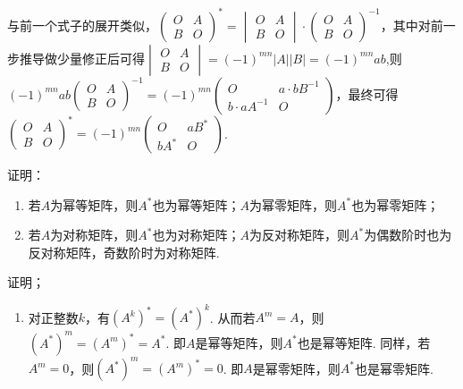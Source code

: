 \begin{exercise}
\begin{exgroup}
\begin{answer}
            与前一个式子的展开类似，$\begin{pmatrix}
                    O & A \\ B & O
                \end{pmatrix}^*=\begin{vmatrix}
                    O & A \\ B & O
                \end{vmatrix}\cdot \begin{pmatrix}
                    O & A \\ B & O
                \end{pmatrix}^{-1}$，其中对前一步推导做少量修正后可得$\begin{vmatrix}
                    O & A \\ B & O
                \end{vmatrix}=(-1)^{mn}|A||B|=(-1)^{mn}ab$,则$(-1)^{mn}ab\begin{pmatrix}
                    O & A \\ B & O
                \end{pmatrix}^{-1}=(-1)^{mn}\begin{pmatrix}
                    O & a\cdot bB^{-1} \\ b\cdot aA^{-1} & O
                \end{pmatrix}$，最终可得$\begin{pmatrix}
                    O & A \\ B & O
                \end{pmatrix}^*=(-1)^{mn}\begin{pmatrix}
                    O & aB^* \\ bA^* & O
                \end{pmatrix}$.
        \end{answer}

        \item 证明：
        \begin{enumerate}
            \item 若$A$为幂等矩阵，则$A^*$也为幂等矩阵；$A$为幂零矩阵，则$A^*$也为幂零矩阵；

            \item 若$A$为对称矩阵，则$A^*$也为对称矩阵；$A$为反对称矩阵，则$A^*$为偶数阶时也为反对称矩阵，奇数阶时为对称矩阵.
        \end{enumerate}
        \begin{answer}
            证明；\begin{enumerate}
                \item 对正整数$k$，有$(A^k)^*=(A^*)^k$. 从而若$A^m=A$，则$(A^*)^m=(A^m)^*=A^*$. 即$A$是幂等矩阵，则$A^*$也是幂等矩阵. 同样，若$A^m=0$，则$(A^*)^m=(A^m)^*=0$. 即$A$是幂零矩阵，则$A^*$也是幂零矩阵.


\end{enumerate}
\end{answer}
\end{exgroup}
\end{exercise}
